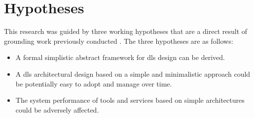 \section{Hypotheses}
\label{sec:ch-intro:hypotheses}


This research was guided by three working hypotheses that are a direct result of grounding work previously conducted \citep{Suleman2007,Suleman2010a}. The three hypotheses are as follows:

\begin{itemize}
 \item A formal simplistic abstract framework for \gls{dls} design can be derived.
 \item A \gls{dls} architectural design based on a simple and minimalistic approach could be potentially easy to adopt and manage over time.
 \item The system performance of tools and services based on simple architectures could be adversely affected.
\end{itemize}